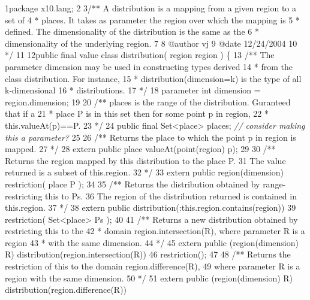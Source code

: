 \begin{tightcode}
\quad\num{1}package x10.lang;
\quad\num{2}
\quad\num{3}/** A distribution is a mapping from a given region to a set of
\quad\num{4} * places. It takes as parameter the region over which the mapping is
\quad\num{5} * defined. The dimensionality of the distribution is the same as the
\quad\num{6} * dimensionality of the underlying region.
\quad\num{7}
\quad\num{8}   @author vj
\quad\num{9}   @date 12/24/2004
\quad\num{10} */
\quad\num{11}
\quad\num{12}public final value class distribution( region region ) \{
\quad\num{13}    /** The parameter dimension may be used in constructing types derived
\quad\num{14}     * from the class distribution. For instance,
\quad\num{15}     * distribution(dimension=k) is the type of all k-dimensional
\quad\num{16}     * distributions.
\quad\num{17}     */
\quad\num{18}    parameter int dimension = region.dimension;
\quad\num{19}
\quad\num{20}    /** places is the range of the distribution. Guranteed that if a
\quad\num{21}     * place P is in this set then for some point p in region,
\quad\num{22}     * this.valueAt(p)==P.
\quad\num{23}     */
\quad\num{24}    public final Set<place> places; \emph{// consider making this a parameter?}
\quad\num{25}
\quad\num{26}    /** Returns the place to which the point p in region is mapped.
\quad\num{27}     */
\quad\num{28}    extern public place valueAt(point(region) p);
\quad\num{29}
\quad\num{30}    /** Returns the region mapped by this distribution to the place P.
\quad\num{31}        The value returned is a subset of this.region.
\quad\num{32}     */
\quad\num{33}    extern public region(dimension) restriction( place P );
\quad\num{34}
\quad\num{35}    /** Returns the distribution obtained by range-restricting this to Ps.
\quad\num{36}        The region of the distribution returned is contained in this.region.
\quad\num{37}     */
\quad\num{38}    extern public distribution(:this.region.contains(region))
\quad\num{39}        restriction( Set<place> Ps );
\quad\num{40}
\quad\num{41}    /** Returns a new distribution obtained by restricting this to the
\quad\num{42}     * domain region.intersection(R), where parameter R is a region
\quad\num{43}     * with the same dimension.
\quad\num{44}     */
\quad\num{45}    extern public (region(dimension) R) distribution(region.intersection(R))
\quad\num{46}        restriction();
\quad\num{47}
\quad\num{48}    /** Returns the restriction of this to the domain region.difference(R),
\quad\num{49}        where parameter R is a region with the same dimension.
\quad\num{50}     */
\quad\num{51}    extern public (region(dimension) R) distribution(region.difference(R))

\end{tightcode}
